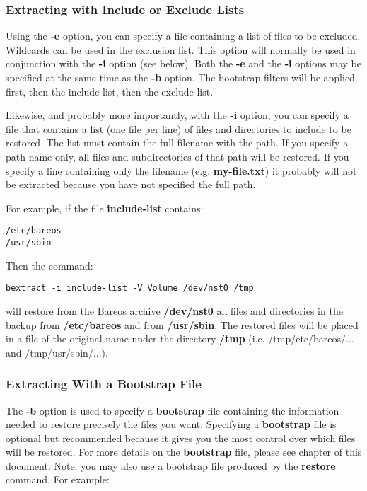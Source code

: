 \subsubsection{Extracting with Include or Exclude Lists}

Using the {\bf -e} option, you can specify a file containing a list of files
to be excluded. Wildcards can be used in the exclusion list. This option will
normally be used in conjunction with the {\bf -i} option (see below). Both the
{\bf -e} and the {\bf -i} options may be specified at the same time as the
{\bf -b} option. The bootstrap filters will be applied first, then the include
list, then the exclude list.

Likewise, and probably more importantly, with the {\bf -i} option, you can
specify a file that contains a list (one file per line) of files and
directories to include to be restored. The list must contain the full filename
with the path. If you specify a path name only, all files and subdirectories
of that path will be restored. If you specify a line containing only the
filename (e.g. {\bf my-file.txt}) it probably will not be extracted because
you have not specified the full path.

For example, if the file {\bf include-list} contains:

\footnotesize
\begin{verbatim}
/etc/bareos
/usr/sbin
\end{verbatim}
\normalsize

Then the command:

\footnotesize
\begin{verbatim}
bextract -i include-list -V Volume /dev/nst0 /tmp
\end{verbatim}
\normalsize

will restore from the Bareos archive {\bf /dev/nst0} all files and directories
in the backup from {\bf /etc/bareos} and from {\bf /usr/sbin}. The
restored files will be placed in a file of the original name under the
directory {\bf /tmp} (i.e. /tmp/etc/bareos/... and
/tmp/usr/sbin/...).

\subsubsection{Extracting With a Bootstrap File}

The {\bf -b} option is used to specify a {\bf bootstrap} file containing the
information needed to restore precisely the files you want. Specifying a {\bf
bootstrap} file is optional but recommended because it gives you the most
control over which files will be restored. For more details on the {\bf
bootstrap} file, please see
chapter of this document. Note, you may also use a bootstrap file produced by
the {\bf restore} command. For example:

